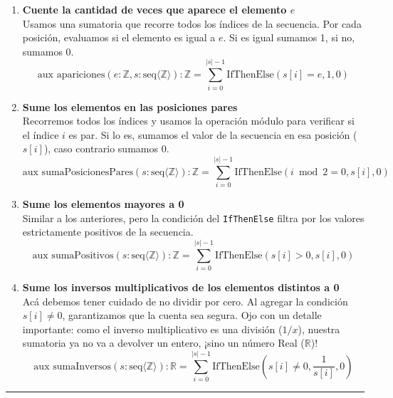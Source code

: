 \begin{enumerate}[label=\textbf{\alph*)}]

    \item \textbf{Cuente la cantidad de veces que aparece el elemento $e$} \\
    Usamos una sumatoria que recorre todos los índices de la secuencia. Por cada posición, evaluamos si el elemento es igual a $e$. Si es igual sumamos 1, si no, sumamos 0.
    \[ \text{aux apariciones}(e: \mathbb{Z}, s: \text{seq}\langle\mathbb{Z}\rangle): \mathbb{Z} = \sum_{i=0}^{|s|-1} \text{IfThenElse}(s[i] = e, 1, 0) \]

    \vspace{0.4cm}
    \item \textbf{Sume los elementos en las posiciones pares} \\
    Recorremos todos los índices y usamos la operación módulo para verificar si el índice $i$ es par. Si lo es, sumamos el valor de la secuencia en esa posición ($s[i]$), caso contrario sumamos 0.
    \[ \text{aux sumaPosicionesPares}(s: \text{seq}\langle\mathbb{Z}\rangle): \mathbb{Z} = \sum_{i=0}^{|s|-1} \text{IfThenElse}(i \bmod 2 = 0, s[i], 0) \]

    \vspace{0.4cm}
    \item \textbf{Sume los elementos mayores a 0} \\
    Similar a los anteriores, pero la condición del \texttt{IfThenElse} filtra por los valores estrictamente positivos de la secuencia.
    \[ \text{aux sumaPositivos}(s: \text{seq}\langle\mathbb{Z}\rangle): \mathbb{Z} = \sum_{i=0}^{|s|-1} \text{IfThenElse}(s[i] > 0, s[i], 0) \]

    \vspace{0.4cm}
    \item \textbf{Sume los inversos multiplicativos de los elementos distintos a 0} \\
    Acá debemos tener cuidado de no dividir por cero. Al agregar la condición $s[i] \neq 0$, garantizamos que la cuenta sea segura. Ojo con un detalle importante: como el inverso multiplicativo es una división ($1/x$), nuestra sumatoria ya no va a devolver un entero, ¡sino un número Real ($\mathbb{R}$)!
    \[ \text{aux sumaInversos}(s: \text{seq}\langle\mathbb{Z}\rangle): \mathbb{R} = \sum_{i=0}^{|s|-1} \text{IfThenElse}(s[i] \neq 0, \frac{1}{s[i]}, 0) \]

\end{enumerate}

\vspace{0.5cm}
\hrule
\vspace{0.5cm}